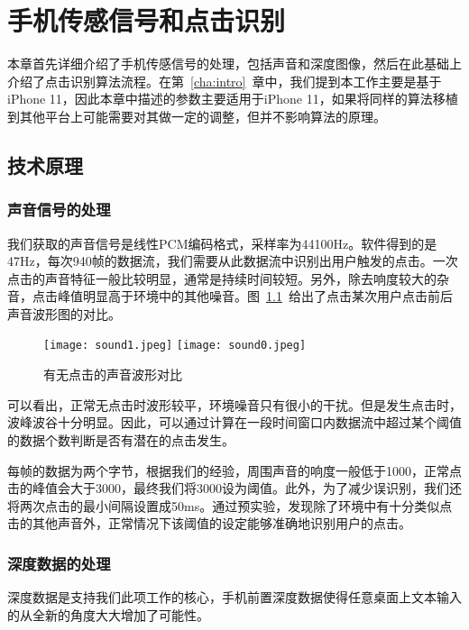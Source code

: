 \chapter{手机传感信号和点击识别}
\label{cha:sensing} %
本章首先详细介绍了手机传感信号的处理，包括声音和深度图像，然后在此基础上介绍了点击识别算法流程。在第~\ref{cha:intro}~章中，我们提到本工作主要是基于iPhone 11，因此本章中描述的参数主要适用于iPhone 11，如果将同样的算法移植到其他平台上可能需要对其做一定的调整，但并不影响算法的原理。

\section{技术原理}
\subsection{声音信号的处理}
我们获取的声音信号是线性PCM编码格式，采样率为44100Hz。软件得到的是47Hz，每次940帧的数据流，我们需要从此数据流中识别出用户触发的点击。一次点击的声音特征一般比较明显，通常是持续时间较短。另外，除去响度较大的杂音，点击峰值明显高于环境中的其他噪音。图~\ref{fig:sound-comp}~给出了点击某次用户点击前后声音波形图的对比。

\begin{figure}[h]
  \centering%
    {\texttt{[image: sound1.jpeg]}}%
  \hspace{4em}%
      {\texttt{[image: sound0.jpeg]}}
  \caption{有无点击的声音波形对比}
  \label{fig:sound-comp}
\end{figure}

可以看出，正常无点击时波形较平，环境噪音只有很小的干扰。但是发生点击时，波峰波谷十分明显。因此，可以通过计算在一段时间窗口内数据流中超过某个阈值的数据个数判断是否有潜在的点击发生。

每帧的数据为两个字节，根据我们的经验，周围声音的响度一般低于1000，正常点击的峰值会大于3000，最终我们将3000设为阈值。此外，为了减少误识别，我们还将两次点击的最小间隔设置成50ms。通过预实验，发现除了环境中有十分类似点击的其他声音外，正常情况下该阈值的设定能够准确地识别用户的点击。

\subsection{深度数据的处理}
深度数据是支持我们此项工作的核心，手机前置深度数据使得任意桌面上文本输入的从全新的角度大大增加了可能性。

